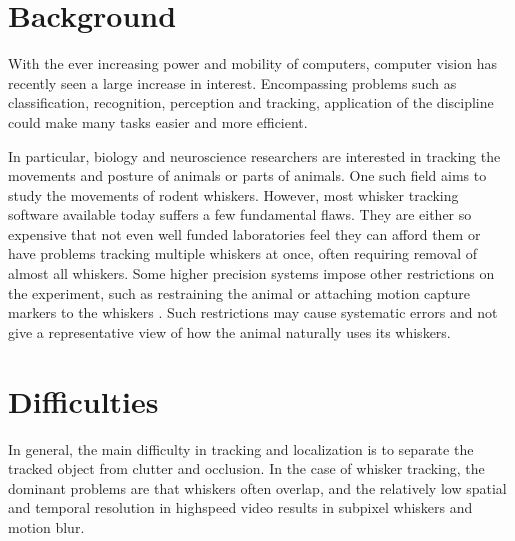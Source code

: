 \section{Background}





With the ever increasing power and mobility of computers, computer vision has recently seen a large increase in interest. 
Encompassing problems such as classification, recognition, perception and tracking, application of the discipline could make many tasks easier and more efficient.

In particular, biology and neuroscience researchers are interested in tracking the movements and posture \cite{WhiskerVideography} of animals or parts of animals.
One such field aims to study the movements of rodent whiskers. However, most whisker tracking software available today suffers a few fundamental flaws.
They are either so expensive that not even well funded laboratories feel they can afford them or have problems tracking multiple whiskers at once, often requiring removal of almost all whiskers. 
Some higher precision systems impose other restrictions on the experiment, such as restraining the animal or attaching motion 
capture markers to the whiskers \cite{BadExample1}. Such restrictions may cause systematic errors and not give 
a representative view of how the animal naturally uses its whiskers.

\section{Difficulties}
In general, the main difficulty in tracking and localization is to separate the tracked object from clutter
and occlusion. In the case of whisker tracking, the dominant problems are that whiskers often overlap, 
and the relatively low spatial and temporal resolution\cite{WhiskerVideography} in highspeed video results in subpixel whiskers and motion blur.

